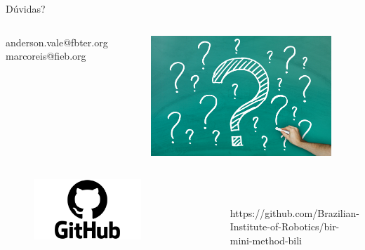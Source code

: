 \begin{frame}{Dúvidas?}
	\begin{columns}
		anderson.vale@fbter.org
		marcoreis@fieb.org
		\begin{figure}[hb]
      		\includegraphics[width=1\textwidth]{figures/duvida.jpg}
		\end{figure}
	\end{columns}

	\begin{columns}
		\column{.2\textwidth}
		\begin{figure}[!ht]
			\includegraphics[width=0.7\textwidth]{figures/github.png}
		\end{figure}
		\column{1\textwidth}
		\\~\\
		https://github.com/Brazilian-Institute-of-Robotics/bir-mini-method-bili
	\end{columns}
\end{frame}